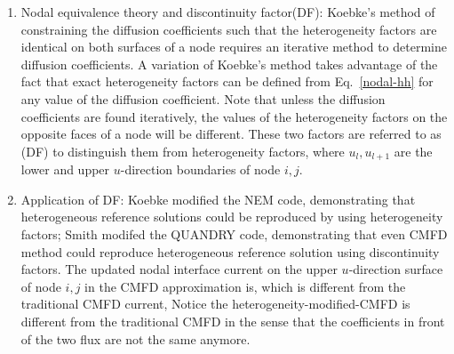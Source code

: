 \documentclass{school-22.211-notes}
\begin{document}
\begin{enumerate}
\item Nodal equivalence theory and discontinuity factor(DF): Koebke's method of constraining the diffusion coefficients such that the heterogeneity factors are identical on both surfaces of a node requires an iterative method to determine diffusion coefficients. A variation of Koebke's method takes advantage of the fact that exact heterogeneity factors can be defined from Eq.~\ref{nodal-hh} for any value of the diffusion coefficient. Note that unless the diffusion coefficients are found iteratively, the values of the heterogeneity factors on the opposite faces of a node will be different. These two factors are referred to as (DF) to distinguish them from heterogeneity factors, 
where $u_l, u_{l+1}$ are the lower and upper $u$-direction boundaries of node $i,j$. 

\item Application of DF: Koebke modified the NEM code, demonstrating that heterogeneous reference solutions could be reproduced by using heterogeneity factors; Smith modifed the QUANDRY code, demonstrating that even CMFD method could reproduce heterogeneous reference solution using discontinuity factors. The updated nodal interface current on the upper $u$-direction surface of node $i,j$ in the CMFD approximation is,
  which is different from the traditional CMFD current, 
  Notice the heterogeneity-modified-CMFD is different from the traditional CMFD in the sense that the coefficients in front of the two flux are not the same anymore. 


\end{enumerate}
\end{document}
